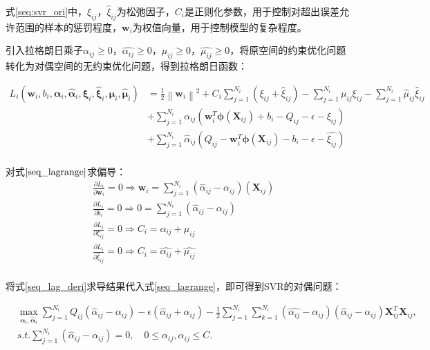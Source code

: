 式\eqref{seq:svr_ori}中，$\xi_{ij}$，$\hat{\xi}_{ij}$为松弛因子，$C_{i}$是正则化参数，用于控制对超出误差允许范围的样本的惩罚程度，$\bm{w}_{i}$为权值向量，用于控制模型的复杂程度。

引入拉格朗日乘子$\alpha_{ij} \geqslant 0$，$\hat{\alpha_{ij}} \geqslant 0$，$\mu_{ij} \geqslant 0$，$\hat{\mu_{ij}} \geqslant 0$，将原空间的约束优化问题转化为对偶空间的无约束优化问题，得到拉格朗日函数：

\begin{equation}\label{seq_lagrange}
\begin{aligned}
L_{i}(\bm{w}_{i}, b_{i}, \bm{\alpha}_{i}, \bm{\hat{\alpha}}_{i}, \bm{\xi}_{i}, \bm{\hat{\xi}}_{i},
\bm{\mu}_{i},\bm{\hat{\mu}}_{i})&=\frac{1}{2} \left \| \bm{{w}}_{i} \right \|^{2} + C_{i} \sum_{j=1}^{N_{i}}(\xi_{ij} + \hat{\xi}_{ij}) - \sum_{j=1}^{N_{i}}\mu_{ij}\xi_{ij} - \sum_{j=1}^{N_{i}}\hat{\mu}_{ij}\hat{\xi}_{ij} \\ 
&+ \sum_{j=1}^{N_{i}} \alpha_{ij}(\bm{w}_{i}^{T} \bm{\phi}(\bm{X}_{ij}) + b_{i} - Q_{ij} - \epsilon - \xi_{ij}) \\
&+ \sum_{j=1}^{N_{i}} \hat{\alpha}_{ij}(Q_{ij} - \bm{w}_{i}^{T} \bm{\phi}(\bm{X}_{ij}) - b_{i} - \epsilon - \hat{\xi_{ij}})\\
\end{aligned}
\end{equation}

对式$\eqref{seq_lagrange}$求偏导：
\begin{equation}\label{seq_lag_deri}
\begin{split}
&\frac{\partial{L_{i}}}{\partial{\bm{w}_{i}}}=0 \Rightarrow \bm{w}_{i} = \sum_{j=1}^{N_{i}}(\hat{\alpha}_{ij}-\alpha_{ij})(\bm{X}_{ij})
\\ 
&\frac{\partial{L_{i}}}{\partial{b_{i}}}=0 \Rightarrow 0 = \sum_{j=1}^{N_{i}}(\hat{\alpha}_{ij}-\alpha_{ij})
\\ 
&\frac{\partial{L_{i}}}{\partial{\xi_{ij}}}=0 \Rightarrow  C_{i} = \alpha_{ij} + \mu_{ij}
\\ 
&\frac{\partial{L_{i}}}{\partial{\hat{\xi}_{ij}}}=0 \Rightarrow  C_{i} = \hat{\alpha_{ij}} + \hat{\mu_{ij}}
\\
\end{split}
\end{equation}

将式\eqref{seq_lag_deri}求导结果代入式\eqref{seq_lagrange}，即可得到SVR的对偶问题：

\begin{equation}\label{seq_lagr_dual}
\begin{split}
&\max_{\bm{\alpha}_{i}, \bm{\hat{\alpha}}_{i}} \sum_{j=1}^{N_{i}} Q_{ij}(\hat{\alpha}_{ij} - \alpha_{ij}) - \epsilon (\hat{\alpha}_{ij} + \alpha_{ij}) - \frac{1}{2} \sum_{j=1}^{N_{i}} \sum_{k=1}^{N_{i}}(\hat{\alpha_{ij}}-\alpha_{ij})(\hat{\alpha}_{ij}-\alpha_{ij})\bm{X}_{ij}^{T}\bm{X}_{ij},\\
&s.t. \sum_{j=1}^{N_{i}}(\hat{\alpha}_{ij}-\alpha_{ij})=0, \quad 0 \leqslant \alpha_{ij},\hat{\alpha}_{ij} \leqslant C.
\end{split}
\end{equation}

